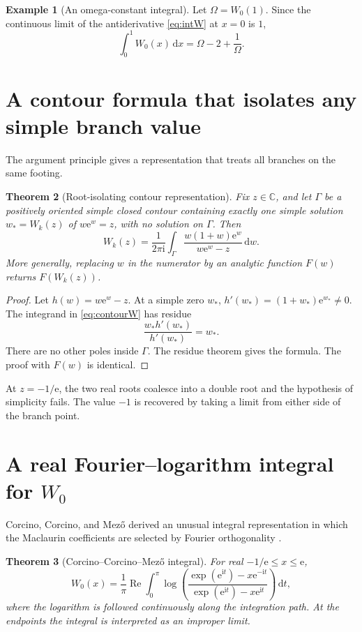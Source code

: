 \documentclass[11pt,openany]{book}
\newcommand{\e}{\mathrm{e}}
\newcommand{\ii}{\mathrm{i}}
\newcommand{\dd}{\,\mathrm{d}}
\newcommand{\C}{\mathbb{C}}
\DeclareMathOperator{\RePart}{Re}
\theoremstyle{plain}
\newtheorem{theorem}{Theorem}[chapter]
\theoremstyle{definition}
\newtheorem{example}[theorem]{Example}
\theoremstyle{remark}
\begin{document}
\begin{example}[An omega-constant integral]
Let \(\Omega=W_0(1)\).  Since the continuous limit of the antiderivative
\eqref{eq:intW} at \(x=0\) is \(1\),
\[
        \int_0^1W_0(x)\dd x
        =\Omega-2+\frac1\Omega.
\]
\end{example}

\section{A contour formula that isolates any simple branch value}
The argument principle gives a representation that treats all branches on the
same footing.

\begin{theorem}[Root-isolating contour representation]\label{thm:contourW}
Fix \(z\in\C\), and let \(\Gamma\) be a positively oriented simple closed
contour containing exactly one simple solution \(w_*=W_k(z)\) of
\(w\e^w=z\), with no solution on \(\Gamma\).  Then
\begin{equation}\label{eq:contourW}
 W_k(z)=\frac{1}{2\pi\ii}
 \int_{\Gamma}
 \frac{w(1+w)\e^w}{w\e^w-z}\dd w.
\end{equation}
More generally, replacing \(w\) in the numerator by an analytic function
\(F(w)\) returns \(F(W_k(z))\).
\end{theorem}

\begin{proof}
Let \(h(w)=w\e^w-z\).  At a simple zero \(w_*\),
\(h'(w_*)=(1+w_*)\e^{w_*}\ne0\).  The integrand in
\eqref{eq:contourW} has residue
\[
       \frac{w_*h'(w_*)}{h'(w_*)}=w_*.
\]
There are no other poles inside \(\Gamma\).  The residue theorem gives the
formula.  The proof with \(F(w)\) is identical.
\end{proof}

At \(z=-1/\e\), the two real roots coalesce into a double root and the
hypothesis of simplicity fails.  The value \(-1\) is recovered by taking a
limit from either side of the branch point.

\section{A real Fourier--logarithm integral for \texorpdfstring{\(W_0\)}{W0}}
Corcino, Corcino, and Mez\H{o} derived an unusual integral representation in
which the Maclaurin coefficients are selected by Fourier orthogonality
\cite{Corcino2018}.

\begin{theorem}[Corcino--Corcino--Mez\H{o} integral]\label{thm:corcinointegral}
For real \(-1/\e\le x\le\e\),
\begin{equation}\label{eq:corcinointegral}
 W_0(x)=\frac1\pi\RePart\int_0^\pi
 \log\left(
   \frac{\exp(\e^{\ii t})-x\e^{-\ii t}}
        {\exp(\e^{\ii t})-x\e^{\ii t}}
 \right)\dd t,
\end{equation}
where the logarithm is followed continuously along the integration path.  At
the endpoints the integral is interpreted as an improper limit.
\end{theorem}
\end{document}
